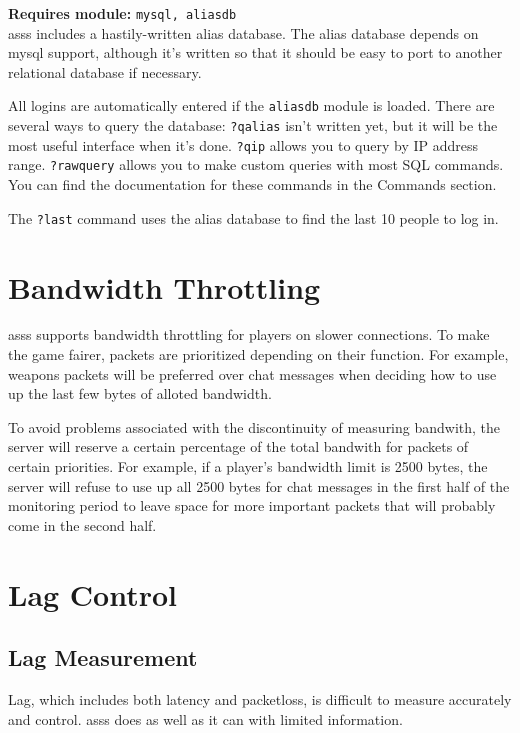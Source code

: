 \documentclass{article}
\newcommand{\asss}{asss}
\newcommand{\requiremod}[1]{\noindent\textbf{Requires module:} \texttt{#1}\\}
\begin{document}
\requiremod{mysql, aliasdb}
\asss{} includes a hastily-written alias database. The alias database
depends on mysql support, although it's written so that it should be
easy to port to another relational database if necessary.

All logins are automatically entered if the \verb/aliasdb/ module is
loaded. There are several ways to query the database: \verb/?qalias/
isn't written yet, but it will be the most useful interface when it's
done. \verb/?qip/ allows you to query by IP address range.
\verb/?rawquery/ allows you to make custom queries with most SQL
commands. You can find the documentation for these commands in the
Commands section.

The \verb/?last/ command uses the alias database to find the last 10
people to log in.


\section{Bandwidth Throttling}

\asss{} supports bandwidth throttling for players on slower connections.
To make the game fairer, packets are prioritized depending on their
function. For example, weapons packets will be preferred over chat
messages when deciding how to use up the last few bytes of alloted
bandwidth.

To avoid problems associated with the discontinuity of measuring
bandwith, the server will reserve a certain percentage of the total
bandwith for packets of certain priorities. For example, if a player's
bandwidth limit is 2500 bytes, the server will refuse to use up all 2500
bytes for chat messages in the first half of the monitoring period to
leave space for more important packets that will probably come in the
second half.



\section{Lag Control}

\subsection{Lag Measurement}

Lag, which includes both latency and packetloss, is difficult to measure
accurately and control. \asss{} does as well as it can with limited
information.
\end{document}
